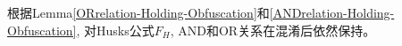 根据Lemma\ref{ORrelation-Holding-Obfuscation}和\ref{ANDrelation-Holding-Obfuscation},
对Husks公式$F_H$,  AND和OR关系在混淆后依然保持。
%
